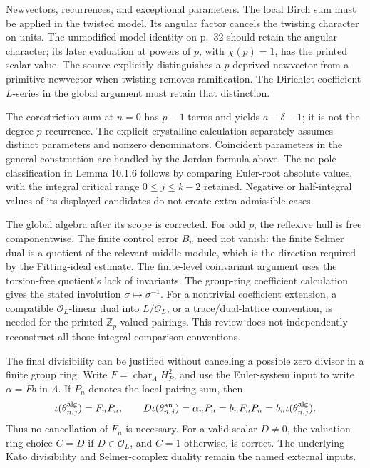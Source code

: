 \documentclass[10pt]{article}
\begin{document}
Newvectors, recurrences, and exceptional parameters. The local Birch sum must be applied in the twisted model. Its angular factor cancels the twisting character on units. The unmodified-model identity on p. 32 should retain the angular character; its later evaluation at powers of \(p\), with \(\chi(p)=1\), has the printed scalar value. The source explicitly distinguishes a \(p\)-deprived newvector from a primitive newvector when twisting removes ramification. The Dirichlet coefficient \(L\)-series in the global argument must retain that distinction.\par
The corestriction sum at \(n=0\) has \(p-1\) terms and yields \(a-\delta-1\); it is not the degree-\(p\) recurrence. The explicit crystalline calculation separately assumes distinct parameters and nonzero denominators. Coincident parameters in the general construction are handled by the Jordan formula above. The no-pole classification in Lemma 10.1.6 follows by comparing Euler-root absolute values, with the integral critical range \(0\leq j\leq k-2\) retained. Negative or half-integral values of its displayed candidates do not create extra admissible cases.\par
The global algebra after its scope is corrected. For odd \(p\), the reflexive hull is free componentwise. The finite control error \(B_n\) need not vanish: the finite Selmer dual is a quotient of the relevant middle module, which is the direction required by the Fitting-ideal estimate. The finite-level coinvariant argument uses the torsion-free quotient’s lack of invariants. The group-ring coefficient calculation gives the stated involution \(\sigma\mapsto\sigma^{-1}\). For a nontrivial coefficient extension, a compatible \(\mathcal O_L\)-linear dual into \(L/\mathcal O_L\), or a trace/dual-lattice convention, is needed for the printed \(\mathbb Z_p\)-valued pairings. This review does not independently reconstruct all those integral comparison conventions.\par
The final divisibility can be justified without canceling a possible zero divisor in a finite group ring. Write \(F=\operatorname{char}_\Lambda H_P^2\), and use the Euler-system input to write \(\alpha=Fb\) in \(\Lambda\). If \(P_n\) denotes the local pairing sum, then \[\iota(\theta^{\rm alg}_{n,j})=F_nP_n,\qquad
 D\iota(\theta^{\rm an}_{n,j})
   =\alpha_nP_n=b_nF_nP_n
   =b_n\iota(\theta^{\rm alg}_{n,j}).\] Thus no cancellation of \(F_n\) is necessary. For a valid scalar \(D\ne0\), the valuation-ring choice \(C=D\) if \(D\in\mathcal O_L\), and \(C=1\) otherwise, is correct. The underlying Kato divisibility and Selmer-complex duality remain the named external inputs.\par
\end{document}
